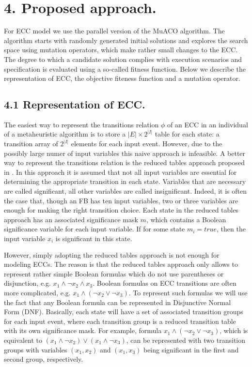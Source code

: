 \documentclass[fleqn,twocolumn]{article}
\begin{document}
\section{4. Proposed approach.}

For ECC model we use the parallel version of the MuACO algorithm. The algorithm starts with randomly generated initial solutions and explores
the search space using mutation operators, which make rather small changes to the ECC. The degree to which a candidate solution complies
with execution scenarios and specification is evaluated using a so-called fitness function. Below we describe the representation of ECC,
the objective fiteness function and a mutation operator.

\subsection{4.1 Representation of ECC.}

The easiest way to represent the transitions relation $\phi$ of an ECC in an individual of a metaheuristic algorithm is to store a $|E| \times 2^{|I|}$
table for each state: a transition array of $2^{|I|}$ elements for each input event. However, due to the possibly large numer of input variables this
naive approach is infeasible. A better way to represent the transitions relation is the reduced tables approach proposed in \cite{mrt}. In this approach it is
assumed that not all input variables are essential for determining the appropriate transition in each state. Variables that are necessary are called
significant, all other variables are called insignificant. Indeed, it is often the case that, though an FB has ten input variables, two or three variables are
enough for making the right transition choice. Each state in the reduced tables approach has an associated significance mask $m$, which contains a Boolean
significance variable for each input variable. If for some state $m_i = true$, then the input variable $x_i$ is significant in this state.

However, simply adopting the reduced tables approach is not enough for modeling ECCs. The reason is that the reduced tables approach only allows to represent
rather simple Boolean formulas which do not use parentheses or disjunction, e.g. $x_1 \wedge \lnot x_2 \wedge x_3$. Boolean formulas on ECC transitions are
often more complicated, e.g. $x_1 \wedge (\lnot x_2 \vee \lnot x_3)$. To represent such formulas we will use the fact that any Boolean formula can be represented
in Disjunctive Normal Form (DNF). Basically, each state will have a set of associated transition groups for each input event, where each transition group is a
reduced transition table with its own significance mask. For example, formula $x_1 \wedge (\lnot x_2 \vee \lnot x_3)$, which is equivalent to 
$(x_1 \wedge \lnot x_2) \vee (x_1 \wedge \lnot x_3)$, can be represented with two transition groups with variables $(x_1, x_2)$ and $(x_1 , x_3)$ being significant
in the first and second group, respectively.
\end{document}
